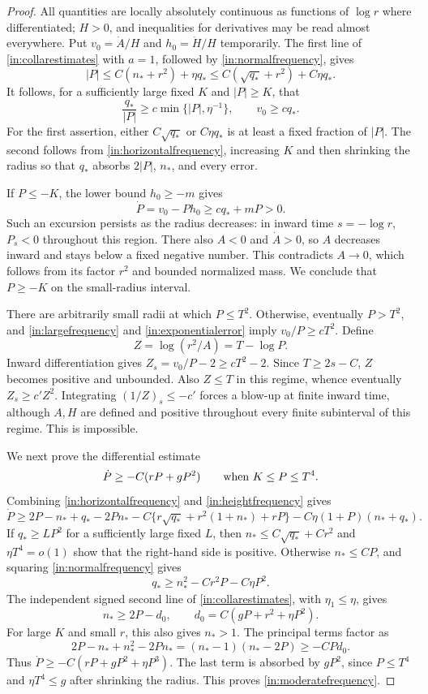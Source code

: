 \begin{proof}
All quantities are locally absolutely continuous as functions of
$\log r$ where differentiated; $H>0$, and inequalities for derivatives
may be read almost everywhere.  Put
$v_0=\dot A/H$ and $h_0=\dot H/H$ temporarily.  The first line of
\eqref{in:collarestimates} with $a=1$, followed by
\eqref{in:normalfrequency}, gives
\[
 |P|\leq C(n_*+r^2)+\eta q_*
       \leq C(\sqrt{q_*}+r^2)+C\eta q_*.
\]
It follows, for a sufficiently large fixed $K$ and $|P|\geq K$, that
\begin{equation}\label{in:largefrequency}
 \frac{q_*}{|P|}\geq c\min\{|P|,\eta^{-1}\},
 \qquad v_0\geq cq_*.
\end{equation}
For the first assertion, either $C\sqrt{q_*}$ or $C\eta q_*$ is at least
a fixed fraction of $|P|$.  The second follows from
\eqref{in:horizontalfrequency}, increasing $K$ and then shrinking the
radius so that $q_*$ absorbs $2|P|$, $n_*$, and every error.

If $P\leq-K$, the lower bound $h_0\geq-m$ gives
\[
 \dot P=v_0-Ph_0\geq cq_*+mP>0.
\]
Such an excursion persists as the radius decreases: in inward time
$s=-\log r$, $P_s<0$ throughout this region.  There also $A<0$ and
$\dot A>0$, so $A$ decreases inward and stays below a fixed negative
number.  This contradicts $A\to0$, which follows from its factor
$r^2$ and bounded normalized mass.  We conclude that $P\geq-K$ on
the small-radius interval.

There are arbitrarily small radii at which $P\leq T^2$.  Otherwise,
eventually $P>T^2$, and \eqref{in:largefrequency} and
\eqref{in:exponentialerror} imply $v_0/P\geq cT^2$.  Define
\[
 Z=\log(r^2/A)=T-\log P.
\]
Inward differentiation gives $Z_s=v_0/P-2\geq cT^2-2$.
Since $T\geq2s-C$, $Z$ becomes positive and unbounded.  Also $Z\leq T$
in this regime, whence eventually $Z_s\geq c'Z^2$.
Integrating $(1/Z)_s\leq-c'$ forces a blow-up at finite inward time,
although $A,H$ are defined and positive throughout every finite
subinterval of this regime.  This is impossible.

We next prove the differential estimate
\begin{equation}\label{in:moderatefrequency}
 \dot P\geq-C(rP+gP^2)
                \qquad\hbox{when }K\leq P\leq T^4.
\end{equation}
Combining \eqref{in:horizontalfrequency} and
\eqref{in:heightfrequency} gives
\[
 \dot P\geq 2P-n_*+q_*-2Pn_*
 -C\{r\sqrt{q_*}+r^2(1+n_*)+rP\}
 -C\eta(1+P)(n_*+q_*).
\]
If $q_*\geq L P^2$ for a sufficiently large fixed $L$, then
$n_*\leq C\sqrt{q_*}+Cr^2$ and $\eta T^4=o(1)$ show that the right-hand
side is positive.  Otherwise $n_*\leq CP$, and squaring
\eqref{in:normalfrequency} gives
\[
 q_*\geq n_*^2-Cr^2P-C\eta P^2.
\]
The independent signed second line of \eqref{in:collarestimates}, with
$\eta_1\leq\eta$, gives
\[
 n_*\geq2P-d_0,\qquad
 d_0=C(gP+r^2+\eta P^2).
\]
For large $K$ and small $r$, this also gives $n_*>1$.  The principal
terms factor as
\[
 2P-n_*+n_*^2-2Pn_*=(n_*-1)(n_*-2P)\geq-CPd_0.
\]
Thus $\dot P\geq-C(rP+gP^2+\eta P^3)$.  The last term is absorbed
by $gP^2$, since $P\leq T^4$ and
$\eta T^4\leq g$ after shrinking the radius.  This proves
\eqref{in:moderatefrequency}.


\end{proof}
